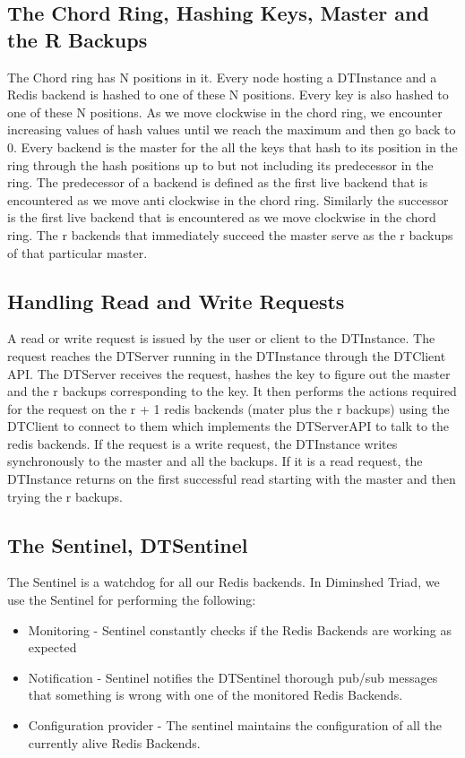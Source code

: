 \documentclass[10pt,twocolumn,letterpaper]{article}
\begin{document}
\subsection{The Chord Ring, Hashing Keys, Master and the R Backups}
The Chord ring has N positions in it. Every node hosting a DTInstance and a Redis backend is hashed to one of these N positions. Every key is also hashed to one of these N positions. As we move clockwise in the chord ring, we encounter increasing values of hash values until we reach the maximum and then go back to 0. Every backend is the master for the all the keys that hash to its position in the ring through the hash positions up to but not including its  predecessor in the ring. The predecessor of a backend is defined as the first live backend that is encountered as we move anti clockwise in the chord ring. Similarly the successor is the first live backend that is encountered as we move clockwise in the chord ring. The r backends that immediately succeed the master serve as the r backups of that particular master. 

\subsection{Handling Read and Write Requests}
A read or write request is issued by the user or client to the DTInstance. The request reaches the DTServer running in the DTInstance through the DTClient API. The DTServer receives the request, hashes the key to figure out the master and the r backups corresponding to the key. It then performs the actions required for the request on the  r + 1 redis backends (mater plus the r backups) using the DTClient to connect to them which implements the DTServerAPI to talk to the redis backends. If the request is a write request, the DTInstance writes synchronously to the master and all the backups. If it is a read request, the DTInstance returns on the first successful read starting with the master and then trying the r backups.


\subsection{The Sentinel, DTSentinel}
The Sentinel is a watchdog for all our Redis backends. In Diminshed Triad, we use the Sentinel for performing the following:
\begin{itemize}
  \item Monitoring - Sentinel constantly checks if the Redis Backends are working as expected
  \item Notification - Sentinel notifies the DTSentinel thorough pub/sub messages that something is wrong with one of the monitored Redis Backends.
  \item Configuration provider - The sentinel maintains the configuration of all the currently alive Redis Backends.
\end{itemize}
\end{document}
